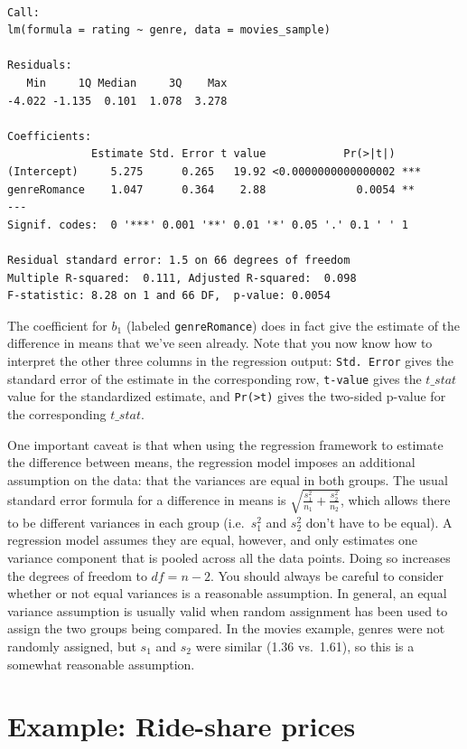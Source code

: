 \documentclass[
  letterpaper,
  DIV=11,
  numbers=noendperiod]{scrreprt}
\theoremstyle{definition}
\theoremstyle{remark}
\begin{document}
\begin{verbatim}

Call:
lm(formula = rating ~ genre, data = movies_sample)

Residuals:
   Min     1Q Median     3Q    Max 
-4.022 -1.135  0.101  1.078  3.278 

Coefficients:
             Estimate Std. Error t value            Pr(>|t|)    
(Intercept)     5.275      0.265   19.92 <0.0000000000000002 ***
genreRomance    1.047      0.364    2.88              0.0054 ** 
---
Signif. codes:  0 '***' 0.001 '**' 0.01 '*' 0.05 '.' 0.1 ' ' 1

Residual standard error: 1.5 on 66 degrees of freedom
Multiple R-squared:  0.111, Adjusted R-squared:  0.098 
F-statistic: 8.28 on 1 and 66 DF,  p-value: 0.0054
\end{verbatim}

The coefficient for \(b_1\) (labeled \texttt{genreRomance}) does in fact
give the estimate of the difference in means that we've seen already.
Note that you now know how to interpret the other three columns in the
regression output: \texttt{Std.\ Error} gives the standard error of the
estimate in the corresponding row, \texttt{t-value} gives the
\(t\_stat\) value for the standardized estimate, and
\texttt{Pr(\textgreater{}\textbar{}t\textbar{})} gives the two-sided
p-value for the corresponding \(t\_stat\).

One important caveat is that when using the regression framework to
estimate the difference between means, the regression model imposes an
additional assumption on the data: that the variances are equal in both
groups. The usual standard error formula for a difference in means is
\(\sqrt{\frac{s_1^2}{n_1} + \frac{s_2^2}{n_2}}\), which allows there to
be different variances in each group (i.e.~\(s_1^2\) and \(s_2^2\) don't
have to be equal). A regression model assumes they are equal, however,
and only estimates one variance component that is pooled across all the
data points. Doing so increases the degrees of freedom to
\(df = n - 2\). You should always be careful to consider whether or not
equal variances is a reasonable assumption. In general, an equal
variance assumption is usually valid when random assignment has been
used to assign the two groups being compared. In the movies example,
genres were not randomly assigned, but \(s_1\) and \(s_2\) were similar
(1.36 vs.~1.61), so this is a somewhat reasonable assumption.

\hypertarget{sec-ride-share}{%
\section{Example: Ride-share prices}\label{sec-ride-share}}
\end{document}
